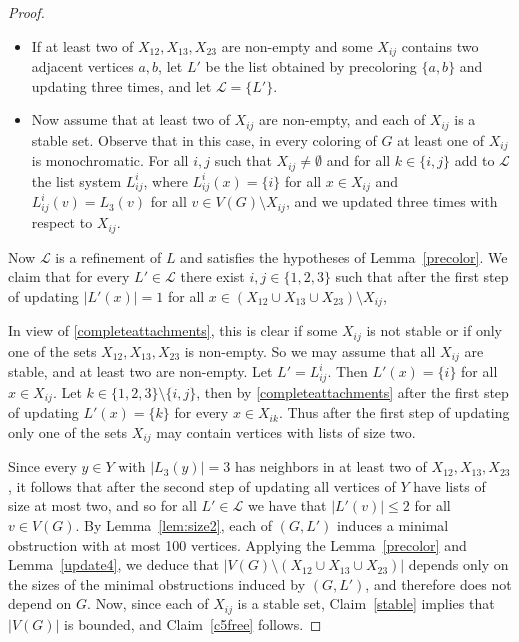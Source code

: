 \documentclass[11pt]{article}
\begin{document}
\begin{proof}
\begin{itemize}
\item If at least two of  $X_{12},X_{13},X_{23}$ are non-empty and some $X_{ij}$ 
contains two adjacent vertices $a,b$,
let $L'$ be the list obtained by precoloring $\{a,b\}$ and  updating three
times, and let $\mathcal{L}=\{L'\}$.

\item  Now assume that at least two of $X_{ij}$ are non-empty, and each
of $X_{ij}$ is a stable set. Observe that in this case, in every coloring of 
$G$ at least one of $X_{ij}$ is monochromatic. For all $i,j$ such that $X_{ij} \neq \emptyset$ and for all  $k \in \{i,j\}$  add to $\mathcal L$  the list system $L_{ij}^i$, where $L_{ij}^i(x)=\{i\}$ for all  $x \in X_{ij}$ and $L_{ij}^i(v)=L_3(v)$ for all $v \in V(G) \setminus X_{ij}$, and we updated three times with respect to $X_{ij}$.
\end{itemize}

Now $\mathcal L$ is a refinement of $L$ and satisfies the hypotheses of 
Lemma~\ref{precolor}. We claim that 
for every $L' \in \mathcal{L}$ there exist $i,j \in \{1,2,3\}$ such that
after the first step of updating  
 $|L'(x)|=1$
for all 
$x \in (X_{12} \cup X_{13} \cup X_{23}) \setminus X_{ij}$,


In view of \eqref{completeattachments},  this is clear if some  $X_{ij}$ is 
not stable or if only one of the sets $X_{12},X_{13},X_{23}$ is non-empty. So we 
may assume that all $X_{ij}$
are stable, and at least two are non-empty. Let $L'=L_{ij}^i$.
Then $L'(x)=\{i\}$ for all $x \in X_{ij}$. 
Let  $k \in \{1,2,3\} \setminus \{i,j\}$, then by \eqref{completeattachments}
after the first step of
updating $L'(x)=\{k\}$ for every $x \in X_{ik}$. Thus after the first step of updating only
one of the sets $X_{ij}$ may contain vertices with lists of size two. 


Since every $y \in Y$ with $|L_3(y)|=3$ has neighbors in at least two of
$X_{12},X_{13},X_{23}$, it follows that after the second step of updating 
all vertices of $Y$ have lists of size at most two, and so 
for all $L' \in \mathcal{L}$ we have that $|L'(v)| \leq 2$ for all $v \in V(G)$.
By Lemma~\ref{lem:size2}, each of $(G,L')$ induces a minimal obstruction
with at most 100 vertices. Applying the Lemma~\ref{precolor} and 
Lemma~\ref{update4}, 
we deduce that $|V(G) \setminus (X_{12} \cup X_{13} \cup X_{23})|$
depends only on the sizes of the minimal obstructions
induced by $(G,L')$, and therefore does not depend on $G$. Now, since each of 
$X_{ij}$ is a stable set, 
Claim~\ref{stable} implies that $|V(G)|$ is bounded, and Claim~\ref{c5free} 
follows.
\end{proof}
\end{document}
